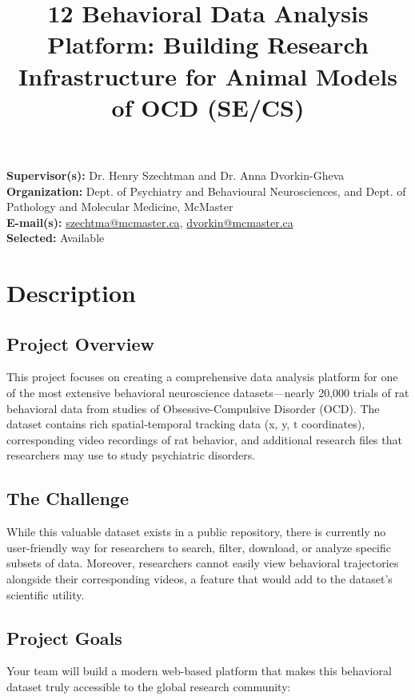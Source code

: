 \documentclass[12pt]{article}
\title{12 Behavioral Data Analysis Platform: Building Research Infrastructure for Animal Models of OCD (SE/CS)}
\author{}
\date{}
\begin{document}
\maketitle

\textbf{Supervisor(s):} Dr. Henry Szechtman and Dr. Anna Dvorkin-Gheva\\
\textbf{Organization:} Dept. of Psychiatry and Behavioural Neurosciences, and Dept. of Pathology and Molecular Medicine, McMaster\\
\textbf{E-mail(s):} \href{mailto:szechtma@mcmaster.ca}{szechtma@mcmaster.ca}, \href{mailto:dvorkin@mcmaster.ca}{dvorkin@mcmaster.ca}\\
\textbf{Selected:} Available

\section*{Description}

\subsection*{Project Overview}
This project focuses on creating a comprehensive data analysis platform for one of the most extensive behavioral neuroscience datasets—nearly 20,000 trials of rat behavioral data from studies of Obsessive-Compulsive Disorder (OCD). The dataset contains rich spatial-temporal tracking data (x, y, t coordinates), corresponding video recordings of rat behavior, and additional research files that researchers may use to study psychiatric disorders.

\subsection*{The Challenge}
While this valuable dataset exists in a public repository, there is currently no user-friendly way for researchers to search, filter, download, or analyze specific subsets of data. Moreover, researchers cannot easily view behavioral trajectories alongside their corresponding videos, a feature that would add to the dataset’s scientific utility.

\subsection*{Project Goals}
Your team will build a modern web-based platform that makes this behavioral dataset truly accessible to the global research community:
\end{document}
